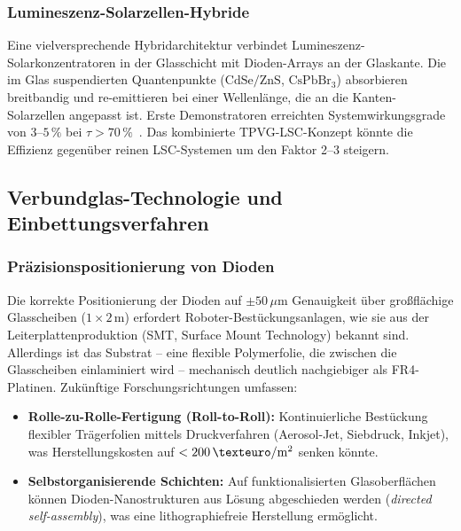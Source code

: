 ﻿\documentclass[a4paper,12pt]{article}
\theoremstyle{definition}
\theoremstyle{remark}
\begin{document}
\subsubsection{Lumineszenz-Solarzellen-Hybride}
Eine vielversprechende Hybridarchitektur verbindet Lumineszenz-Solarkonzentratoren in der Glasschicht mit Dioden-Arrays an der Glaskante. Die im Glas
suspendierten Quantenpunkte ($\mathrm{CdSe/ZnS}$, $\mathrm{CsPbBr_3}$)
absorbieren breitbandig und re-emittieren bei einer Wellenlänge, die an
die Kanten-Solarzellen angepasst ist. Erste Demonstratoren erreichten
Systemwirkungsgrade von $3$--$5\,\%$ bei $\tau > 70\,\%$~\cite{Brovelli2022}.
Das kombinierte TPVG-LSC-Konzept könnte die Effizienz gegenüber reinen
LSC-Systemen um den Faktor 2--3 steigern.

\subsection{Verbundglas-Technologie und Einbettungsverfahren}

\subsubsection{Präzisionspositionierung von Dioden}
Die korrekte Positionierung der Dioden auf $\pm 50\,\mu\mathrm{m}$
Genauigkeit über großflächige Glasscheiben ($1 \times 2\,\mathrm{m}$)
erfordert Roboter-Bestückungsanlagen, wie sie aus der Leiterplattenproduktion
(SMT, Surface Mount Technology) bekannt sind. Allerdings ist das
Substrat -- eine flexible Polymerfolie, die zwischen die Glasscheiben
einlaminiert wird -- mechanisch deutlich nachgiebiger als FR4-Platinen.
Zukünftige Forschungsrichtungen umfassen:
\begin{itemize}
  \item \textbf{Rolle-zu-Rolle-Fertigung (Roll-to-Roll):} Kontinuierliche
    Bestückung flexibler Trägerfolien mittels Druckverfahren
    (Aerosol-Jet, Siebdruck, Inkjet), was Herstellungskosten auf
    $<200\,\mathrm{\texteuro/m^2}$ senken könnte.
  \item \textbf{Selbstorganisierende Schichten:} Auf funktionalisierten
    Glasoberflächen können Dioden-Nanostrukturen aus Lösung abgeschieden
    werden (\emph{directed self-assembly}), was eine lithographiefreie
    Herstellung ermöglicht.
\end{itemize}
\end{document}
